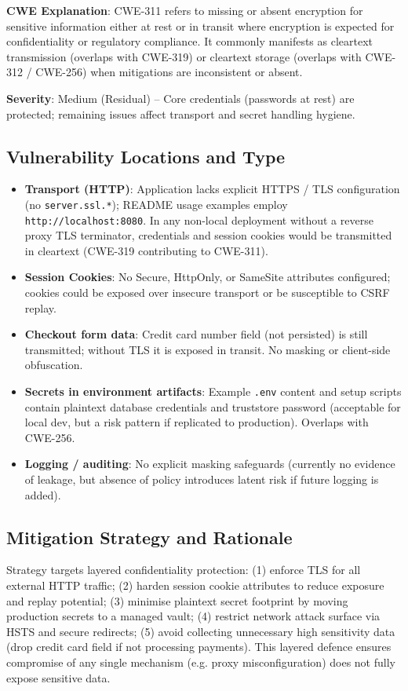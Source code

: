 \documentclass[]{UCD_CS_FYP_Report}
\begin{document}
	\textbf{CWE Explanation}: CWE-311 refers to missing or absent encryption for sensitive information either at rest or in transit where encryption is expected for confidentiality or regulatory compliance. It commonly manifests as cleartext transmission (overlaps with CWE-319) or cleartext storage (overlaps with CWE-312 / CWE-256) when mitigations are inconsistent or absent.

	\textbf{Severity}: Medium (Residual) -- Core credentials (passwords at rest) are protected; remaining issues affect transport and secret handling hygiene.

\subsection{Vulnerability Locations and Type}
\begin{itemize}
	\item \textbf{Transport (HTTP)}: Application lacks explicit HTTPS / TLS configuration (no \texttt{server.ssl.*}); README usage examples employ \texttt{http://localhost:8080}. In any non-local deployment without a reverse proxy TLS terminator, credentials and session cookies would be transmitted in cleartext (CWE-319 contributing to CWE-311).
	\item \textbf{Session Cookies}: No Secure, HttpOnly, or SameSite attributes configured; cookies could be exposed over insecure transport or be susceptible to CSRF replay.
	\item \textbf{Checkout form data}: Credit card number field (not persisted) is still transmitted; without TLS it is exposed in transit. No masking or client-side obfuscation.
	\item \textbf{Secrets in environment artifacts}: Example \texttt{.env} content and setup scripts contain plaintext database credentials and truststore password (acceptable for local dev, but a risk pattern if replicated to production). Overlaps with CWE-256.
	\item \textbf{Logging / auditing}: No explicit masking safeguards (currently no evidence of leakage, but absence of policy introduces latent risk if future logging is added).
\end{itemize}

\subsection{Mitigation Strategy and Rationale}
Strategy targets layered confidentiality protection: (1) enforce TLS for all external HTTP traffic; (2) harden session cookie attributes to reduce exposure and replay potential; (3) minimise plaintext secret footprint by moving production secrets to a managed vault; (4) restrict network attack surface via HSTS and secure redirects; (5) avoid collecting unnecessary high sensitivity data (drop credit card field if not processing payments). This layered defence ensures compromise of any single mechanism (e.g. proxy misconfiguration) does not fully expose sensitive data.
\end{document}
